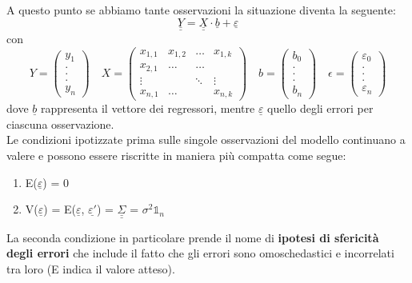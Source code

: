 \documentclass[]{article}
\def\doubleunderline#1{\underline{\underline{#1}}}
\begin{document}
A questo punto se abbiamo tante osservazioni la situazione diventa la seguente:
\begin{equation}
\doubleunderline{Y} = \doubleunderline{X} \cdot \underline{b} + \underline{\varepsilon}
\end{equation}
con
\begin{equation}
Y = 
\begin{pmatrix}
y_1 \\ 
. \\ 
. \\ 
. \\ 
y_n
\end{pmatrix}
\quad
X = \begin{pmatrix}
x_{1,1} & x_{1,2} & \dots & x_{1,k} \\ 
x_{2,1} & \dots & \dots &  \\ 
\vdots &  & \ddots & \vdots \\ 
x_{n,1} & \dots &  & x_{n,k}
\end{pmatrix} 
\quad
b = \begin{pmatrix}
b_0 \\ 
. \\ 
. \\ 
. \\ 
b_n
\end{pmatrix} 
\quad
\epsilon = \begin{pmatrix}
\varepsilon_0 \\ 
. \\ 
. \\ 
. \\ 
\varepsilon_n
\end{pmatrix} 
\end{equation}
dove $\underline{b}$ rappresenta il vettore dei regressori, mentre $\underline{\varepsilon}$ quello degli errori per ciascuna osservazione.\\
Le condizioni ipotizzate prima sulle singole osservazioni del modello continuano a valere e possono essere riscritte in maniera più compatta come segue:
\begin{enumerate}
\item E($\underline{\varepsilon}$) = 0
\item V($\underline{\varepsilon}$) = E($\underline{\varepsilon}$, $\underline{\varepsilon'}$) = $\doubleunderline{\Sigma}$ = $\sigma^2 \mathds{1}_n$ 
\end{enumerate}
La seconda condizione in particolare prende il nome di \textbf{ipotesi di sfericità degli errori} che include il fatto che gli errori sono omoschedastici e incorrelati tra loro (E indica il valore atteso).
\end{document}
